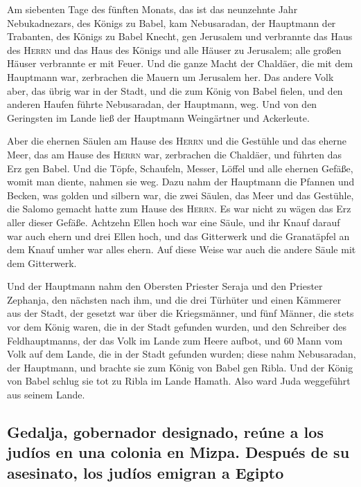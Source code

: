  Am siebenten Tage des fünften Monats, das ist das
neunzehnte Jahr Nebukadnezars, des Königs zu Babel, kam Nebusaradan, der
Hauptmann der Trabanten, des Königs zu Babel Knecht, gen Jerusalem
 und verbrannte das Haus des \textsc{Herrn} und das Haus
des Königs und alle Häuser zu Jerusalem; alle großen Häuser verbrannte
er mit Feuer.  Und die ganze Macht der Chaldäer, die mit
dem Hauptmann war, zerbrachen die Mauern um Jerusalem her.
 Das andere Volk aber, das übrig war in der Stadt, und
die zum König von Babel fielen, und den anderen Haufen führte
Nebusaradan, der Hauptmann, weg.  Und von den Geringsten
im Lande ließ der Hauptmann Weingärtner und Ackerleute.

 Aber die ehernen Säulen am Hause des \textsc{Herrn} und
die Gestühle und das eherne Meer, das am Hause des \textsc{Herrn} war,
zerbrachen die Chaldäer, und führten das Erz gen Babel. 
Und die Töpfe, Schaufeln, Messer, Löffel und alle ehernen Gefäße, womit
man diente, nahmen sie weg.  Dazu nahm der Hauptmann die
Pfannen und Becken, was golden und silbern war,  die zwei
Säulen, das Meer und das Gestühle, die Salomo gemacht hatte zum Hause
des \textsc{Herrn}. Es war nicht zu wägen das Erz aller dieser Gefäße.
 Achtzehn Ellen hoch war eine Säule, und ihr Knauf darauf
war auch ehern und drei Ellen hoch, und das Gitterwerk und die
Granatäpfel an dem Knauf umher war alles ehern. Auf diese Weise war auch
die andere Säule mit dem Gitterwerk.

 Und der Hauptmann nahm den Obersten Priester Seraja und
den Priester Zephanja, den nächsten nach ihm, und die drei Türhüter
 und einen Kämmerer aus der Stadt, der gesetzt war über
die Kriegsmänner, und fünf Männer, die stets vor dem König waren, die in
der Stadt gefunden wurden, und den Schreiber des Feldhauptmanns, der das
Volk im Lande zum Heere aufbot, und 60 Mann vom Volk auf dem Lande, die
in der Stadt gefunden wurden;  diese nahm Nebusaradan,
der Hauptmann, und brachte sie zum König von Babel gen Ribla.
 Und der König von Babel schlug sie tot zu Ribla im Lande
Hamath. Also ward Juda weggeführt aus seinem Lande.

\hypertarget{gedalja-gobernador-designado-reuxfane-a-los-juduxedos-en-una-colonia-en-mizpa.-despuuxe9s-de-su-asesinato-los-juduxedos-emigran-a-egipto}{%
\subsection{Gedalja, gobernador designado, reúne a los judíos en una
colonia en Mizpa. Después de su asesinato, los judíos emigran a
Egipto}\label{gedalja-gobernador-designado-reuxfane-a-los-juduxedos-en-una-colonia-en-mizpa.-despuuxe9s-de-su-asesinato-los-juduxedos-emigran-a-egipto}}

